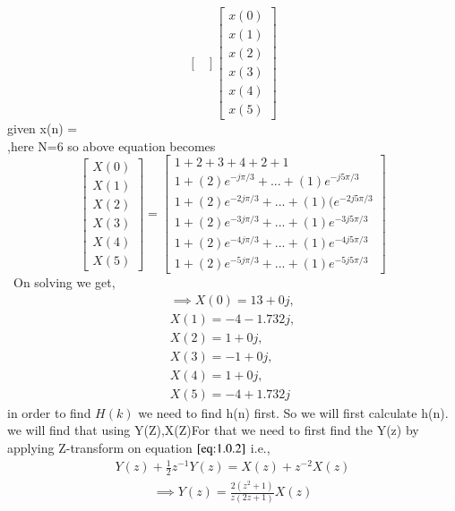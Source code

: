 \documentclass[journal,12pt,twocolumn]{IEEEtran}
\renewcommand\thesection{\arabic{section}}
\begin{document}
\begin{enumerate}[label=\thesection.\arabic*.,ref=\thesection.\theenumi]
\begin{equation}
\begin{bmatrix}
\end{bmatrix}%
\begin{bmatrix}
x(0) \\ x(1) \\ x(2) \\ x(3) \\ x(4) \\x(5)
\end{bmatrix}
\end{equation}
given x(n) =  \\,here N=6 so above equation becomes
\begin{equation}
\begin{bmatrix} X(0) \\ X(1) \\ X(2) \\ X(3) \\ X(4) \\ X(5) \end{bmatrix}
=
\begin{bmatrix}
1 +2+3+4+2+1 \\ 1+ (2)e^{-j\pi /3} + ... + (1)e^{-j5\pi /3}\\ 1 + (2)e^{-2j\pi /3} + ... +(1)(e^{-2j5\pi /3}\\ 1 + (2)e^{-3j\pi /3} + ... + (1)e^{-3j5\pi /3}\\ 1 + (2)e^{-4j\pi /3} + ... + (1)e^{-4j5\pi /3}\\ 1 + (2)e^{-5j\pi /3} + ... + (1)e^{-5j5\pi /3}
\end{bmatrix}
\end{equation}
\
On solving we get,
\begin{align}
    \implies X(0) = 13 + 0j,\\
    X(1) = -4 - 1.732j,\\
    X(2) = 1 + 0j,
    \\
    X(3) = -1 + 0j,\\
    X(4) = 1 + 0j,\\
    X(5) = -4 + 1.732j
\end{align}
in order to find $H(k)$ we need to find h(n) first. So we will first calculate h(n). we will find that using Y(Z),X(Z)For that we need to first find the Y(z) by applying Z-transform on equation $\eqref{eq:1.0.2}$ i.e.,
\begin{align}
    Y(z) + \frac{1}{2}z^{-1}Y(z)=X(z) + z^{-2}X(z)
\end{align}
\begin{align}
    \implies Y(z)=\frac{2(z^2+1)}{z(2z+1)}X(z)
\end{align}

\end{enumerate}
\end{document}
